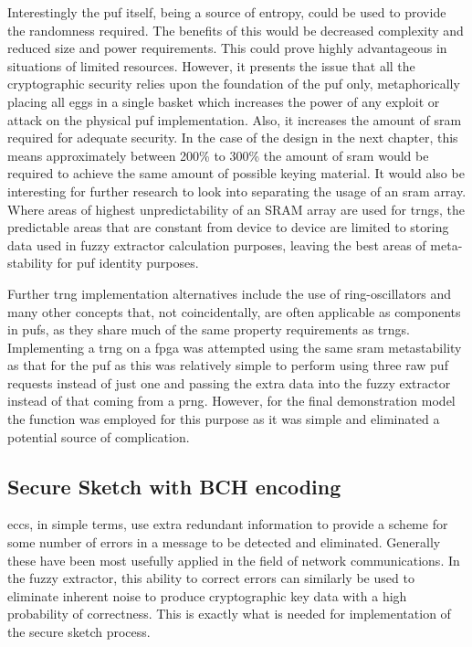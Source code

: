 Interestingly the \gls{puf} itself, being a source of entropy, could be used to
provide the randomness required. The benefits of this would be decreased complexity and
reduced size and power requirements. This could prove highly advantageous in situations of limited
resources.
However, it presents the issue that all the cryptographic
security relies upon the foundation of the \gls{puf} only, metaphorically placing all eggs in
a single basket which increases the power of any
exploit or attack on the physical \gls{puf} implementation.
Also, it increases the amount of
\gls{sram} required for adequate security.
In the case of the design in the next chapter, this means
approximately between 200\% to 300\% the amount of \gls{sram} would be required to achieve the
same amount of possible keying material.
It would also be interesting for further research to look
into separating the usage of an \gls{sram} array.
Where areas of highest
unpredictability of an SRAM array are used for \glspl{trng}, the predictable
areas that are constant from device to device are limited
to storing data used in fuzzy extractor calculation purposes,
leaving the best areas of meta-stability for \gls{puf} identity purposes.

Further \gls{trng} implementation alternatives include the use of
ring-oscillators and many other concepts that, not coincidentally, are often
applicable as components in \glspl{puf},
as they share much of the same property requirements as \glspl{trng}.
Implementing a \gls{trng} on a \gls{fpga} was attempted using the
same \gls{sram} metastability as that for the \gls{puf} as this was relatively
simple to perform using three raw puf requests instead of just one and passing
the extra data into the fuzzy extractor
instead of that coming from a \matlab \gls{prng}.
However, for the final demonstration model the
\matlab {} function was employed for this purpose as it was
simple and eliminated a potential source of complication.

\subsection{Secure Sketch with BCH encoding}

\Glspl{ecc}, in simple terms, use extra redundant information to
provide a scheme for some number of errors in a message to be detected and
eliminated. Generally these have been most usefully applied in the field of
network communications. In the fuzzy extractor, this ability to correct errors
can similarly be used to eliminate inherent noise to produce cryptographic key
data with a high probability of correctness. This is exactly what is needed for
implementation of the secure sketch process.

